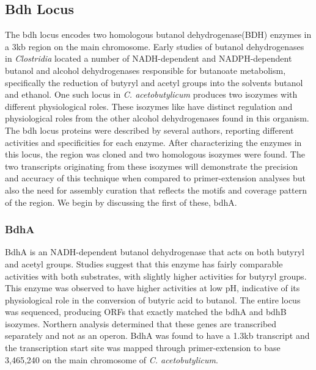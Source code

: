 \subsection{Bdh Locus}
The bdh locus encodes two homologous butanol dehydrogenase(BDH) enzymes in a 3kb region on the main chromosome. Early studies of butanol dehydrogenases in \textit{Clostridia} located a number of NADH-dependent and NADPH-dependent butanol and alcohol dehydrogenases responsible for butanoate metabolism\cite{70,71,72,73}, specifically the reduction of butyryl and acetyl groups into the solvents butanol and ethanol. One such locus in \textit{C. acetobutylicum} produces two isozymes with different physiological roles. These isozymes like have distinct regulation and physiological roles from the other alcohol dehydrogenases found in this organism. The bdh locus proteins were described by several authors, reporting different activities and specificities for each enzyme\cite{70,71}. After characterizing the enzymes in this locus, the region was cloned and two homologous isozymes were found. The two transcripts originating from these isozymes will demonstrate the precision and accuracy of this technique when compared to primer-extension analyses but also the need for assembly curation that reflects the motifs and coverage pattern of the region. We begin by discussing the first of these, bdhA.
\subsubsection{BdhA}
BdhA is an NADH-dependent butanol dehydrogenase that acts on both butyryl and acetyl groups. Studies suggest that this enzyme has fairly comparable activities with both substrates, with slightly higher activities for butyryl groups\cite{71}. This enzyme was observed to have higher activities at low pH, indicative of its physiological role in the conversion of butyric acid to butanol. The entire locus was sequenced, producing ORFs that exactly matched the bdhA and bdhB isozymes\cite{73}. Northern analysis determined that these genes are transcribed separately and not as an operon. BdhA was found to have a 1.3kb transcript and the transcription start site was mapped through primer-extension to base 3,465,240 on the main chromosome of \textit{C. acetobutylicum}\cite{73}. 


